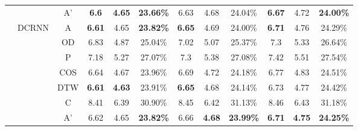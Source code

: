 \begin{table}[t!]
\begin{center}
{\begin{tabular}{c|c|c|ccc|ccc|ccc}
                                               &                        & A'    & \textbf{6.6}                          & \textbf{4.65}                         & \textbf{23.66\%}                      & 6.63          & 4.68          & 24.04\%          & \textbf{6.67} & 4.72          & \textbf{24.00\%} \\
                \cline{2-12}
                                               & \multirow{7}{*}{DCRNN} & A     & \textbf{6.61}                         & 4.65                                  & \textbf{23.82\%}                      & \textbf{6.65} & 4.69          & 24.00\%          & \textbf{6.71} & 4.76          & 24.29\%          \\
                                               &                        & OD    & 6.83                                  & 4.87                                  & 25.04\%                               & 7.02          & 5.07          & 25.37\%          & 7.3           & 5.33          & 26.64\%          \\
                                               &                        & P     & 7.18                                  & 5.27                                  & 27.07\%                               & 7.3           & 5.38          & 27.08\%          & 7.42          & 5.51          & 27.54\%          \\
                                               &                        & COS   & 6.64                                  & 4.67                                  & 23.96\%                               & 6.69          & 4.72          & 24.18\%          & 6.77          & 4.83          & 24.51\%          \\
                                               &                        & DTW   & \textbf{6.61}                         & \textbf{4.63}                         & 23.91\%                               & \textbf{6.65} & 4.68          & 24.14\%          & 6.73          & 4.77          & 24.42\%          \\
                                               &                        & C     & 8.41                                  & 6.39                                  & 30.90\%                               & 8.45          & 6.42          & 31.13\%          & 8.46          & 6.43          & 31.18\%          \\
                                               &                        & A'    & 6.62                                  & 4.65                                  & \textbf{23.82\%}                      & 6.66          & \textbf{4.68} & \textbf{23.99\%} & \textbf{6.71} & \textbf{4.75} & \textbf{24.25\%} \\

\end{tabular}}
\end{center}
\end{table}
